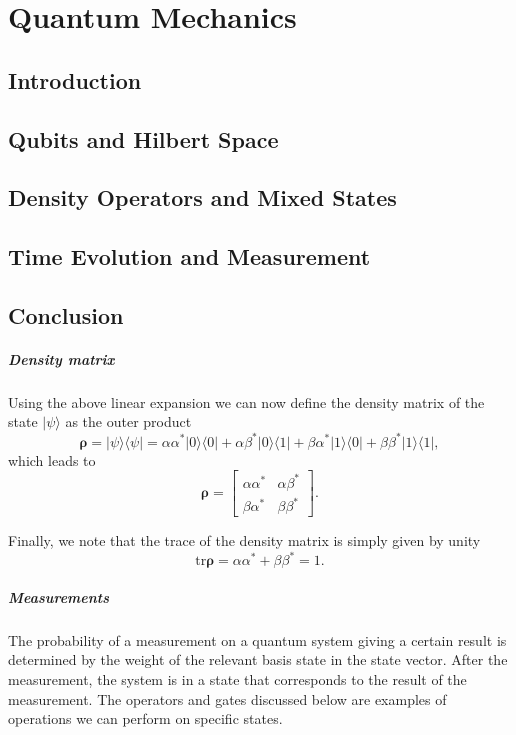 \chapter{Quantum Mechanics}
\section{Introduction}
\section{Qubits and Hilbert Space}
\section{Density Operators and Mixed States}
\section{Time Evolution and Measurement}
\section{Conclusion}


\paragraph{Density matrix}

Using the above linear expansion we can now define the density matrix of the state $\vert \psi\rangle$ as the outer product
\[
\bm{\rho}=\vert \psi \rangle\langle \psi \vert = \alpha\alpha^* \vert 0 \rangle\langle 0\vert+\alpha\beta^* \vert 0 \rangle\langle 1\vert+\beta\alpha^* \vert 1 \rangle\langle 0\vert+\beta\beta^* \vert 1 \rangle\langle 1\vert,
\]
which leads to
\[
\bm{\rho}=\begin{bmatrix} \alpha\alpha^* & \alpha\beta^*\\ \beta\alpha^* & \beta\beta^*\end{bmatrix}.
\]

Finally, we note that the trace of the density matrix is simply given by unity
\[
\mathrm{tr}\bm{\rho}=\alpha\alpha^* +\beta\beta^*=1.
\]



\paragraph{Measurements}

The probability of a measurement on a quantum system giving a certain
result is determined by the weight of the relevant basis state in the
state vector. After the measurement, the system is in a state that
corresponds to the result of the measurement. The operators and
gates discussed below are examples of operations we can perform on
specific states.

